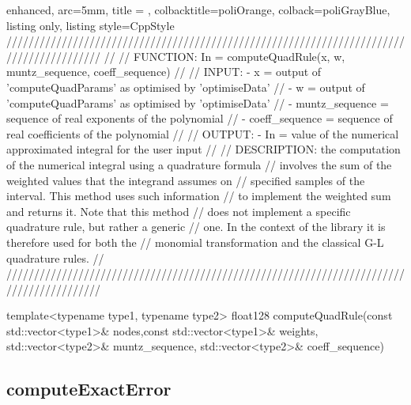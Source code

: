 \documentclass[a4paper, twosided]{book}
\begin{document}
\begin{tcblisting}{enhanced,
                   arc=5mm,
                   title = \color{black}{\large \ttfamily MonMap.cpp/computeQuadRule},
                   colbacktitle=poliOrange,
                   colback=poliGrayBlue,
                   listing only,
                   listing style=CppStyle}
/////////////////////////////////////////////////////////////////////////////////////////
//
//       FUNCTION: In = computeQuadRule(x, w, muntz_sequence, coeff_sequence)
//                
//          INPUT: - x = output of 'computeQuadParams' as optimised by 'optimiseData'
//                 - w = output of 'computeQuadParams' as optimised by 'optimiseData'
//                 - muntz_sequence = sequence of real exponents of the polynomial
//                 - coeff_sequence = sequence of real coefficients of the polynomial
//
//         OUTPUT: - In = value of the numerical approximated integral for the user input
//
//    DESCRIPTION: the computation of the numerical integral using a quadrature formula 
//                 involves the sum of the weighted values that the integrand assumes on
//                 specified samples of the interval. This method uses such information
//                 to implement the weighted sum and returns it. Note that this method
//                 does not implement a specific quadrature rule, but rather a generic
//                 one. In the context of the library it is therefore used for both the
//                 monomial transformation and the classical G-L quadrature rules.
//
/////////////////////////////////////////////////////////////////////////////////////////

template<typename type1, typename type2>
float128 computeQuadRule(const std::vector<type1>& nodes,const std::vector<type1>& weights, std::vector<type2>& muntz_sequence, std::vector<type2>& coeff_sequence)
\end{tcblisting}

\subsection[computeExactError]{\changefont computeExactError}\label{SubSec4.1.6}
\end{document}

